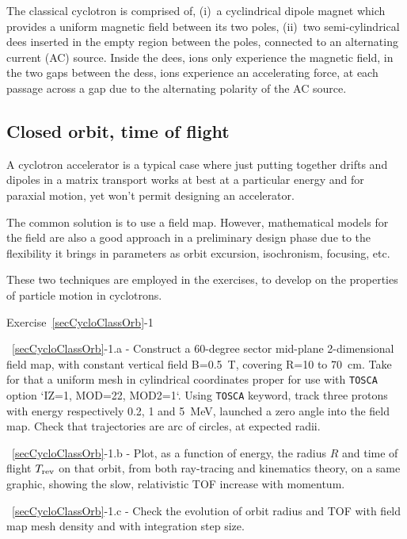 The classical cyclotron  is comprised of, (i)~a cyclindrical dipole magnet which provides a uniform 
 magnetic field between its two poles, (ii)~two semi-cylindrical dees inserted 
in the empty region between the  poles, connected to an alternating current (AC) source. 
Inside the dees, ions only experience the magnetic field, in the two gaps between the dess, ions 
experience an accelerating force, at each passage across a gap due to the alternating polarity of the AC source.



\subsection{Closed orbit, time of flight \label{secCycloClassOrb}}

A cyclotron accelerator is a typical case 
where just putting together drifts and dipoles in a matrix transport works at best 
at a particular energy and for paraxial motion, yet won't permit designing an accelerator. 

The common solution is to use a field map. However, mathematical models for the field 
are also a good approach in a preliminary design phase due to the flexibility it brings 
in parameters as orbit excursion, isochronism, focusing, etc.

These two techniques are employed  in the exercises, to develop on the properties of particle motion 
in cyclotrons. 

\smallskip
\noindent {\small $\bullet$} Exercise~\ref{secCycloClassOrb}-1 

\noindent ~\ref{secCycloClassOrb}-1.a - 
Construct a 60-degree sector mid-plane 2-dimensional field map, with constant vertical field 
B=0.5~T, covering R=10 to 70~cm. Take for that a uniform mesh in cylindrical coordinates proper for use 
with \texttt{TOSCA} option `IZ=1, MOD=22, MOD2=1`. 
Using \texttt{TOSCA} keyword, track three protons with energy respectively 0.2, 1 and 5~MeV,
launched a zero angle into the field map. 
Check that trajectories are arc of circles, at expected radii. 

\noindent ~\ref{secCycloClassOrb}-1.b - 
 Plot, as a function of energy, the 
  radius $R$ and  time of flight $T_{\rm rev}$ on that orbit, 
 from both ray-tracing and kinematics theory, on a same graphic, 
showing   the slow, relativistic TOF increase with momentum. 

\noindent ~\ref{secCycloClassOrb}-1.c - 
Check the evolution of orbit radius and TOF  with field map mesh density and with 
integration step size.



